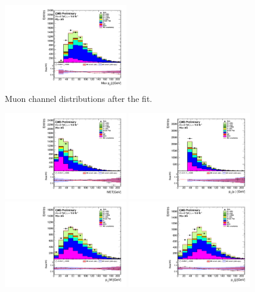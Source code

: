 \begin{figure}[htbp]
		\includegraphics[width=0.48\textwidth]{Figures/Results/Muon/postfit/Wbb_max_hJet_pt_doQCD1.pdf}		
	\caption{Muon channel distributions after the fit.}
	\label{fig:Wbb_postfit_mu}
\end{figure}

\begin{figure}[htbp]
	\centering
		\includegraphics[width=0.48\textwidth]{Figures/Results/Electron/postfit/Wbb_GetMET_doQCD1.pdf}
		\includegraphics[width=0.48\textwidth]{Figures/Results/Electron/postfit/Wbb_vLepton_pt_doQCD1.pdf}
		\includegraphics[width=0.48\textwidth]{Figures/Results/Electron/postfit/Wbb_GetWpt_doQCD1.pdf}
		\includegraphics[width=0.48\textwidth]{Figures/Results/Electron/postfit/Wbb_H_pt_doQCD1.pdf}

\end{figure}
